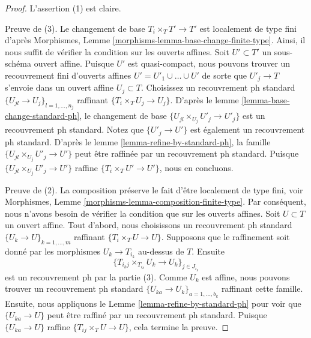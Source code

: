 \begin{proof}
L'assertion (1) est claire.

\medskip\noindent
Preuve de (3). Le changement de base $T_i \times_T T' \to T'$ est localement de type fini d'après Morphismes, Lemme \ref{morphisms-lemma-base-change-finite-type}. Ainsi, il nous suffit de vérifier la condition sur les ouverts affines. Soit $U' \subset T'$ un sous-schéma ouvert affine. Puisque $U'$ est quasi-compact, nous pouvons trouver un recouvrement fini d'ouverts affines $U' = U'_1 \cup \ldots \cup U'$ de sorte que $U'_j \to T$ s'envoie dans un ouvert affine $U_j \subset T$. Choisissez un recouvrement ph standard $\{U_{jl} \to U_j\}_{l = 1, \ldots, n_j}$ raffinant $\{T_i \times_T U_j \to U_j\}$. D'après le lemme \ref{lemma-base-change-standard-ph}, le changement de base $\{U_{jl} \times_{U_j} U'_j \to U'_j\}$ est un recouvrement ph standard. Notez que $\{U'_j \to U'\}$ est également un recouvrement ph standard. D'après le lemme \ref{lemma-refine-by-standard-ph}, la famille $\{U_{jl} \times_{U_j} U'_j \to U'\}$ peut être raffinée par un recouvrement ph standard. Puisque $\{U_{jl} \times_{U_j} U'_j \to U'\}$ raffine $\{T_i \times_T U' \to U'\}$, nous en concluons.

\medskip\noindent
Preuve de (2). La composition préserve le fait d'être localement de type fini, voir Morphismes, Lemme \ref{morphisms-lemma-composition-finite-type}. Par conséquent, nous n'avons besoin de vérifier la condition que sur les ouverts affines. Soit $U \subset T$ un ouvert affine. Tout d'abord, nous choisissons un recouvrement ph standard $\{U_k \to U\}_{k = 1, \ldots, m}$ raffinant $\{T_i \times_T U \to U\}$. Supposons que le raffinement soit donné par les morphismes $U_k \to T_{i_k}$ au-dessus de $T$. Ensuite
$$
\{T_{i_kj} \times_{T_{i_k}} U_k \to U_k\}_{j \in J_{i_k}}
$$
est un recouvrement ph par la partie (3). Comme $U_k$ est affine, nous pouvons trouver un recouvrement ph standard $\{U_{ka} \to U_k\}_{a = 1, \ldots, b_k}$ raffinant cette famille. Ensuite, nous appliquons le Lemme \ref{lemma-refine-by-standard-ph} pour voir que $\{U_{ka} \to U\}$ peut être raffiné par un recouvrement ph standard. Puisque $\{U_{ka} \to U\}$ raffine $\{T_{ij} \times_T U \to U\}$, cela termine la preuve.
\end{proof}

